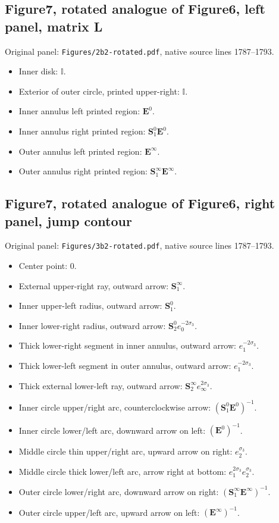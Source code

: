 \subsection*{Figure7, rotated analogue of Figure6, left panel, matrix L}
\noindent Original panel: \texttt{Figures/2b2-rotated.pdf}, native source lines 1787--1793.
\begin{itemize}\itemsep=0pt
\item Inner disk: $\mathbb{I}$.
\item Exterior of outer circle, printed upper-right: $\mathbb{I}$.
\item Inner annulus left printed region: $\mathbf{E}^0{}$.
\item Inner annulus right printed region: $\mathbf{S}_1^0{}\mathbf{E}^0{}$.
\item Outer annulus left printed region: $\mathbf{E}^\infty{}$.
\item Outer annulus right printed region: $\mathbf{S}_1^\infty{}\mathbf{E}^\infty{}$.
\end{itemize}

\subsection*{Figure7, rotated analogue of Figure6, right panel, jump contour}
\noindent Original panel: \texttt{Figures/3b2-rotated.pdf}, native source lines 1787--1793.
\begin{itemize}\itemsep=0pt
\item Center point: $0$.
\item External upper-right ray, outward arrow: $\mathbf{S}_1^\infty{}$.
\item Inner upper-left radius, outward arrow: $\mathbf{S}_1^0{}$.
\item Inner lower-right radius, outward arrow: $\mathbf{S}_2^0{}e_0^{-2\sigma_3}$.
\item Thick lower-right segment in inner annulus, outward arrow: $e_1^{-2\sigma_3}$.
\item Thick lower-left segment in outer annulus, outward arrow: $e_1^{-2\sigma_3}$.
\item Thick external lower-left ray, outward arrow: $\mathbf{S}_2^\infty{}e_\infty^{2\sigma_3}$.
\item Inner circle upper/right arc, counterclockwise arrow: $(\mathbf{S}_1^0{}\mathbf{E}^0{})^{-1}$.
\item Inner circle lower/left arc, downward arrow on left: $(\mathbf{E}^0{})^{-1}$.
\item Middle circle thin upper/right arc, upward arrow on right: $e_2^{\sigma_3}$.
\item Middle circle thick lower/left arc, arrow right at bottom: $e_1^{2\sigma_3}e_2^{\sigma_3}$.
\item Outer circle lower/right arc, downward arrow on right: $(\mathbf{S}_1^\infty{}\mathbf{E}^\infty{})^{-1}$.
\item Outer circle upper/left arc, upward arrow on left: $(\mathbf{E}^\infty{})^{-1}$.
\end{itemize}


